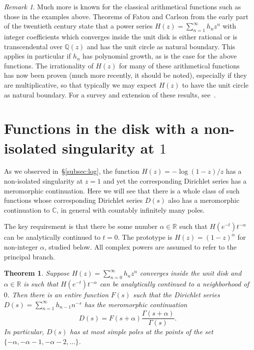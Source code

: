 \documentclass[11pt,a4paper]{amsart}
\newcommand{\N}{\mathbb{N}}
\newcommand{\Z}{\mathbb{Z}}
\newcommand{\Q}{\mathbb{Q}}
\newcommand{\R}{\mathbb{R}}
\newcommand{\C}{\mathbb{C}}
\theoremstyle{plain}
\newtheorem{theorem}{Theorem}
\theoremstyle{plain}
\theoremstyle{plain}
\theoremstyle{definition}
\theoremstyle{remark}
\newtheorem*{remark}{Remark}
\begin{document}
\begin{remark} 
Much more is known for the classical arithmetical functions such as those in the examples above. Theorems of Fatou and Carlson from the early part of the twentieth century state that a power series $H(z) = \sum_{n=1}^{\infty} h_{n} z^{n}$ with integer coefficients which converges inside the unit disk is either rational or is transcendental over $\Q(z)$ and has the unit circle as natural boundary. This applies in particular if $h_{n}$ has polynomial growth, as is the case for the above functions. The irrationality of $H(z)$ for many of these arithmetical functions has now been proven (much more recently, it should be noted), especially if they are multiplicative, so that typically we may expect $H(z)$ to have the unit circle as natural boundary. For a survey and extension of these results, see~\cite{Bell-Transcendence}.
\end{remark}


\section{Functions in the disk with a non-isolated singularity at $1$}
\label{sec:non-isolated}

As we observed in~\S\ref{subsec:log}, the function $H(z) = -\log(1-z)/z$ has a non-isolated singularity at $z=1$ and yet the corresponding Dirichlet series has a meromorphic continuation. Here we will see that there is a whole class of such functions whose corresponding Dirichlet series $D(s)$ also has a meromorphic continuation to $\C$, in general with countably infinitely many poles. 

The key requirement is that there be some number $\alpha \in \R$ such that $H(e^{-t})  t^{-\alpha}$ can be analytically continued to $t=0$. The prototype is $H(z) = (1-z)^{\alpha}$ for non-integer $\alpha$, studied below. All complex powers are assumed to refer to the principal branch.


\begin{theorem}
\label{th:sing_log}
Suppose $H(z) = \sum_{n=0}^{\infty} h_{n} z^{n}$ converges inside the unit disk and $\alpha \in \R$ is such that $H(e^{-t}) t^{-\alpha}$ can be analytically continued to a neighborhood of $0$. Then there is an entire function $F(s)$ such that the Dirichlet series $D(s) = \sum_{n=1}^{\infty} h_{n-1} n^{-s}$ has the meromorphic continuation
\begin{equation*}
  D(s) = F(s+\alpha)\frac{\Gamma(s+\alpha)}{\Gamma(s)}.  
\end{equation*}
In particular, $D(s)$ has at most simple poles at the points 
of the set $\{-\alpha,\allowbreak-\alpha-1,\allowbreak-\alpha-2,\ldots\}$.
\end{theorem}
\end{document}

